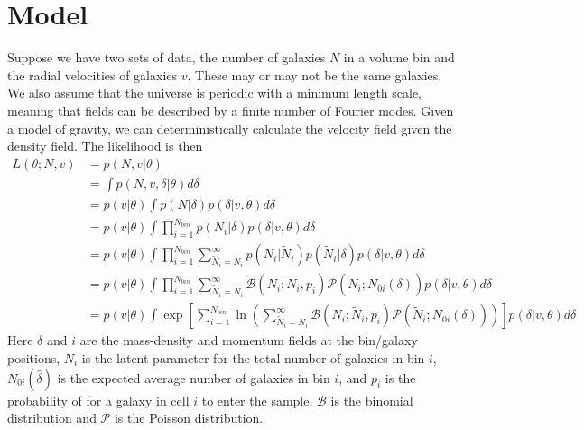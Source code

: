 \documentclass{article}
\begin{document}
\section{Model}

Suppose we have two sets of data, the number of galaxies $N$ in a volume
bin and the radial velocities of galaxies $v$.  These may or may not be the same galaxies.
We also assume that the universe is periodic with a minimum length scale, meaning that fields can be
described by a finite number of Fourier modes.  Given a model of gravity, we can deterministically calculate the
velocity field given the density field.
The likelihood is then
\begin{align}
L(\theta; N, v) & =p(N, v| \theta) \\
& = \int p(N,v,\delta | \theta) d\delta \\\
& = p(v|\theta)  \int p(N | \delta) p(\delta| v, \theta) d\delta \\
& = p(v|\theta)  \int \prod_{i=1}^{N_{bin}}  p(N_i | \delta) p(\delta| v, \theta) d\delta \\
& = p(v|\theta)  \int \prod_{i=1}^{N_{bin}}  \sum_{\tilde{N}_i =N_i}^\infty    p(N_i | \tilde{N}_i) p(\tilde{N}_i | \delta)  p(\delta| v, \theta) d\delta \\
& = p(v|\theta)  \int \prod_{i=1}^{N_{bin}}  \sum_{\tilde{N}_i =N_i}^\infty    \mathcal{B}(N_i; \tilde{N}_i, p_i) \mathcal{P}(\tilde{N}_i ; N_{0i}(\delta))  p(\delta| v, \theta) d\delta \\
& =  p(v|\theta)  \int  \exp \left[ \sum_{i=1}^{N_{bin}} \ln{  \left( \sum_{\tilde{N}_i =N_i}^\infty  \mathcal{B}(N_i; \tilde{N}_i, p_i) \mathcal{P}(\tilde{N}_i ; N_{0i}(\delta))\right)} \right]  p(\delta| v, \theta) d\delta 
\end{align}
Here $\delta$ and $i$ are  the mass-density  and momentum fields at the bin/galaxy positions, $\tilde{N}_i$ is the latent parameter
for the  total number of galaxies in bin $i$, $N_{0i}(\hat{\delta})$ is the expected
average number of galaxies in bin $i$, and $p_i$ is the probability of for a galaxy in cell $i$ to enter the sample.
$\mathcal{B}$ is the binomial distribution and $\mathcal{P}$ is the Poisson distribution.
\end{document}
